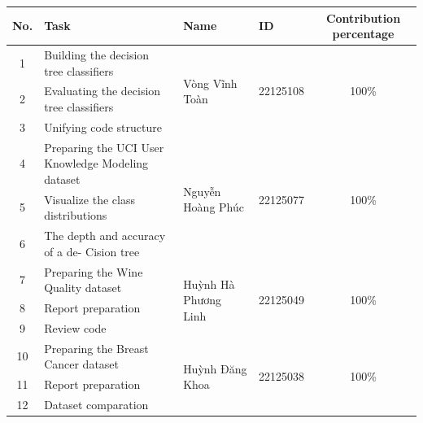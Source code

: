 \documentclass{article}
\begin{document}

\begin{table}[h!]
    \centering
    \begin{tabular}{|c|p{5cm}|p{3.5cm}|p{2cm}|c|}
    \hline
    \textbf{No.} & \textbf{Task} & \textbf{Name} & \textbf{ID} & \textbf{Contribution percentage} \\ \hline
    
    1 & Building the decision tree classifiers & \multirow{3}{*}{Vòng Vĩnh Toàn} & \multirow{3}{*}{22125108} & \multirow{3}{*}{100\%} \\ \cline{1-2}
    2 & Evaluating the decision tree classifiers &  &  &  \\ \cline{1-2}
    3 & Unifying code structure &  &  &  \\ \hline
    
    4 & Preparing the UCI User Knowledge Modeling dataset & \multirow{3}{*}{Nguyễn Hoàng Phúc} & \multirow{3}{*}{22125077} & \multirow{3}{*}{100\%} \\ \cline{1-2}
    5 & Visualize the class distributions &  &  &  \\ \cline{1-2}
    6 & The depth and accuracy of a de-
    Cision tree &  &  &  \\ \hline
    
    7 & Preparing the Wine Quality dataset & \multirow{3}{*}{Huỳnh Hà Phương Linh} & \multirow{3}{*}{22125049} & \multirow{3}{*}{100\%} \\ \cline{1-2}
    8 & Report preparation &  &  &  \\ \cline{1-2}
    9 & Review code &  &  &  \\ \hline
    
    10 & Preparing the Breast Cancer dataset  & \multirow{3}{*}{Huỳnh Đăng Khoa} & \multirow{3}{*}{22125038} & \multirow{3}{*}{100\%} \\ \cline{1-2}
    11 & Report preparation &  &  &  \\ \cline{1-2}
    12 & Dataset comparation &  &  &  \\ \hline
    
    \end{tabular}
    \end{table}
\newpage


\end{document}
